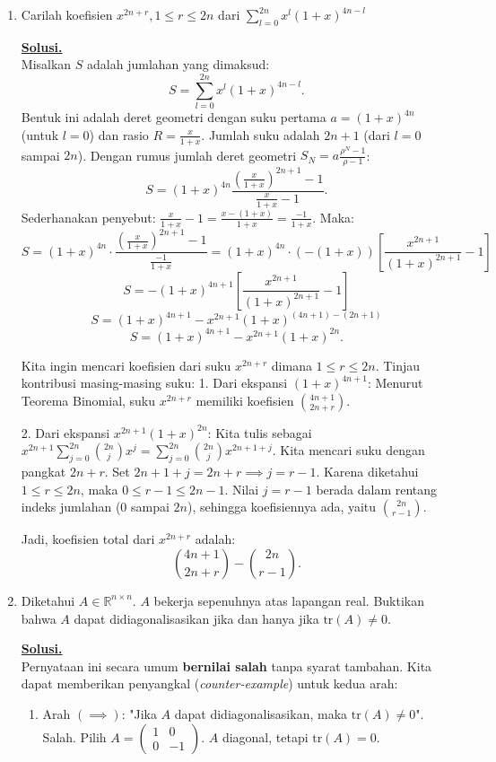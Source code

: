 \documentclass[12pt,twoside]{article}
\newenvironment{solution}
{
	\par\noindent\textbf{\underline{Solusi.}}\\
}
{
	\par
}
\begin{document}
\begin{enumerate}
  \item Carilah koefisien $x^{2n+r},1\leq r\leq 2n$ dari $\displaystyle\sum_{l=0}^{2n}x^l\left(1+x\right)^{4n-l}$
        \begin{solution}
          Misalkan $S$ adalah jumlahan yang dimaksud:
          $$ S = \sum_{l=0}^{2n} x^l (1+x)^{4n-l}. $$
          Bentuk ini adalah deret geometri dengan suku pertama $a = (1+x)^{4n}$ (untuk $l=0$) dan rasio $R = \frac{x}{1+x}$.
          Jumlah suku adalah $2n+1$ (dari $l=0$ sampai $2n$).
          Dengan rumus jumlah deret geometri $S_N = a \frac{\rho^N - 1}{\rho - 1}$:
          $$ S = (1+x)^{4n} \frac{\left(\frac{x}{1+x}\right)^{2n+1} - 1}{\frac{x}{1+x} - 1}. $$
          Sederhanakan penyebut: $\frac{x}{1+x} - 1 = \frac{x - (1+x)}{1+x} = \frac{-1}{1+x}$.
          Maka:
          $$ S = (1+x)^{4n} \cdot \frac{\left(\frac{x}{1+x}\right)^{2n+1} - 1}{\frac{-1}{1+x}} = (1+x)^{4n} \cdot (-(1+x)) \left[ \frac{x^{2n+1}}{(1+x)^{2n+1}} - 1 \right] $$
          $$ S = -(1+x)^{4n+1} \left[ \frac{x^{2n+1}}{(1+x)^{2n+1}} - 1 \right] $$
          $$ S = (1+x)^{4n+1} - x^{2n+1} (1+x)^{(4n+1)-(2n+1)} $$
          $$ S = (1+x)^{4n+1} - x^{2n+1} (1+x)^{2n}. $$

          Kita ingin mencari koefisien dari suku $x^{2n+r}$ dimana $1 \le r \le 2n$.
          Tinjau kontribusi masing-masing suku:
          1. Dari ekspansi $(1+x)^{4n+1}$:
          Menurut Teorema Binomial, suku $x^{2n+r}$ memiliki koefisien $\binom{4n+1}{2n+r}$.

          2. Dari ekspansi $x^{2n+1}(1+x)^{2n}$:
          Kita tulis sebagai $x^{2n+1} \sum_{j=0}^{2n} \binom{2n}{j} x^j = \sum_{j=0}^{2n} \binom{2n}{j} x^{2n+1+j}$.
          Kita mencari suku dengan pangkat $2n+r$.
          Set $2n+1+j = 2n+r \implies j = r-1$.
          Karena diketahui $1 \le r \le 2n$, maka $0 \le r-1 \le 2n-1$.
          Nilai $j=r-1$ berada dalam rentang indeks jumlahan ($0$ sampai $2n$), sehingga koefisiennya ada, yaitu $\binom{2n}{r-1}$.

          Jadi, koefisien total dari $x^{2n+r}$ adalah:
          $$ \binom{4n+1}{2n+r} - \binom{2n}{r-1}. $$
        \end{solution}


  \item Diketahui $A\in \mathbb{R}^{n\times n}$. $A$ bekerja sepenuhnya atas lapangan real. Buktikan bahwa $A$ dapat didiagonalisasikan jika dan hanya jika $\text{tr}(A)\neq0$.
        \begin{solution}
          Pernyataan ini secara umum \textbf{bernilai salah} tanpa syarat tambahan.
          Kita dapat memberikan penyangkal (\textit{counter-example}) untuk kedua arah:
          \begin{enumerate}
            \item Arah $(\implies)$: "Jika $A$ dapat didiagonalisasikan, maka $\text{tr}(A)\neq 0$".
                  Salah. Pilih $A = \begin{pmatrix} 1 & 0 \\ 0 & -1 \end{pmatrix}$. $A$ diagonal, tetapi $\text{tr}(A)=0$.


\end{enumerate}
\end{solution}
\end{enumerate}
\end{document}
